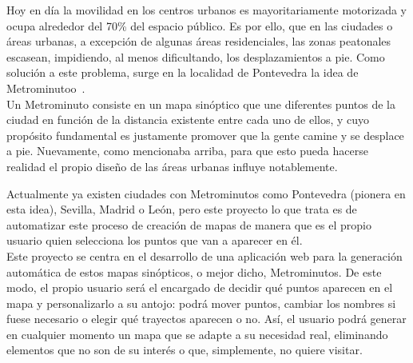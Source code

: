 
Hoy en día la movilidad en los centros urbanos es mayoritariamente motorizada y ocupa alrededor del 70\% del espacio público. Es por ello, que en las ciudades o áreas urbanas, a excepción de algunas áreas residenciales, las zonas peatonales escasean, impidiendo, al menos dificultando, los desplazamientos a pie. Como solución a este problema, surge en la localidad de Pontevedra la idea de Metrominutoo~\cite{metrominuto}.
\\


Un Metrominuto consiste en un mapa sinóptico que une diferentes puntos de la ciudad en función de la distancia existente entre cada uno de ellos, y cuyo propósito fundamental es justamente promover que la gente camine y se desplace a pie. Nuevamente, como mencionaba arriba, para que esto pueda hacerse realidad el propio diseño de las áreas urbanas influye notablemente.


Actualmente ya existen ciudades con Metrominutos como Pontevedra (pionera en esta idea), Sevilla, Madrid o León, pero este proyecto lo que trata es de automatizar este proceso de creación de mapas de manera que es el propio usuario quien selecciona los puntos que van a aparecer en él.
\\


Este proyecto se centra en el desarrollo de una aplicación web para la generación automática de estos mapas sinópticos, o mejor dicho, Metrominutos. De este modo, el propio usuario será el encargado de decidir qué puntos aparecen en el mapa y personalizarlo a su antojo: podrá mover puntos, cambiar los nombres si fuese necesario o elegir qué trayectos aparecen o no. Así, el usuario podrá generar en cualquier momento un mapa que se adapte a su necesidad real, eliminando elementos que no son de su interés o que, simplemente, no quiere visitar.